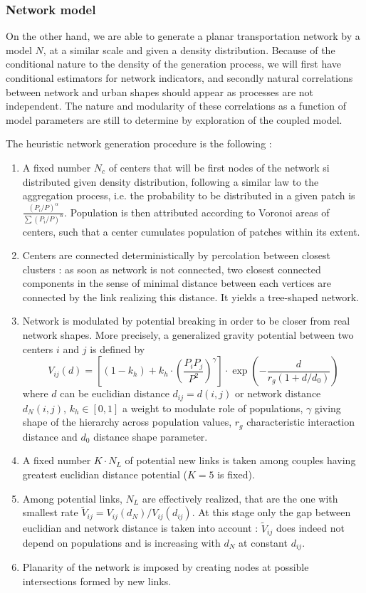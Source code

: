 \documentclass{article}
\begin{document}
\subsubsection*{Network model}


On the other hand, we are able to generate a planar transportation network by a model $N$, at a similar scale and given a density distribution. Because of the conditional nature to the density of the generation process, we will first have conditional estimators for network indicators, and secondly natural correlations between network and urban shapes should appear as processes are not independent. The nature and modularity of these correlations as a function of model parameters are still to determine by exploration of the coupled model.



The heuristic network generation procedure is the following :
\begin{enumerate}
\item A fixed number $N_c$ of centers that will be first nodes of the network si distributed given density distribution, following a similar law to the aggregation process, i.e. the probability to be distributed in a given patch is $\frac{(P_i/P)^{\alpha}}{\sum (P_i/P)^{\alpha}}$. Population is then attributed according to Voronoi areas of centers, such that a center cumulates population of patches within its extent.
\item Centers are connected deterministically by percolation between closest clusters : as soon as network is not connected, two closest connected components in the sense of minimal distance between each vertices are connected by the link realizing this distance. It yields a tree-shaped network.
\item Network is modulated by potential breaking in order to be closer from real network shapes. More precisely, a generalized gravity potential between two centers $i$ and $j$ is defined by
\[
V_{ij}(d) = \left[ (1 - k_h) + k_h \cdot \left( \frac{P_i P_j}{P^2} \right)^{\gamma} \right]\cdot \exp{\left( -\frac{d}{r_g (1 + d/d_0)} \right)}
\]
where $d$ can be euclidian distance $d_{ij}=d(i,j)$ or network distance $d_N(i,j)$, $k_h \in [0,1]$ a weight to modulate role of populations, $\gamma$ giving shape of the hierarchy across population values, $r_g$ characteristic interaction distance and $d_0$ distance shape parameter.
\item A fixed number $K\cdot N_L$ of potential new links is taken among couples having greatest euclidian distance potential ($K=5$ is fixed).
\item Among potential links, $N_L$ are effectively realized, that are the one with smallest rate $\tilde{V}_{ij} = V_{ij}(d_N)/V_{ij}(d_{ij})$. At this stage only the gap between euclidian and network distance is taken into account : $\tilde{V}_{ij}$ does indeed not depend on populations and is increasing with $d_N$ at constant $d_{ij}$.
\item Planarity of the network is imposed by creating nodes at possible intersections formed by new links.
\end{enumerate}
\end{document}

